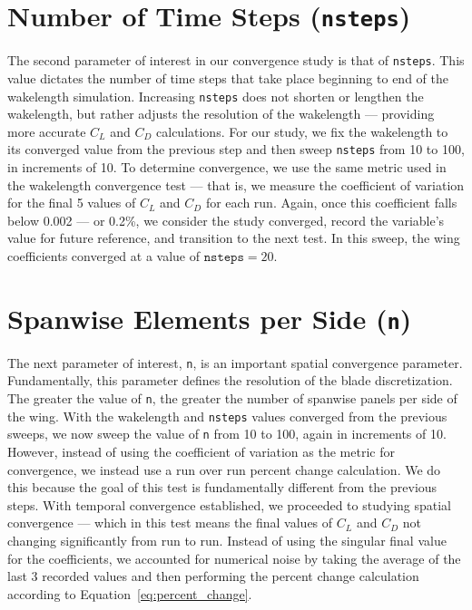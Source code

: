 \documentclass{report}
\begin{document}
\section{Number of Time Steps (\texttt{nsteps})}
The second parameter of interest in our convergence study is that of \texttt{nsteps}. This value dictates the number of time steps that take place beginning to end of the wakelength simulation.
Increasing \texttt{nsteps} does not shorten or lengthen the wakelength, but rather adjusts the resolution of the wakelength --- providing more accurate $C_L$ and $C_D$ calculations.
For our study, we fix the wakelength to its converged value from the previous step and then sweep \texttt{nsteps} from 10 to 100, in increments of 10.
To determine convergence, we use the same metric used in the wakelength convergence test --- that is, we measure the coefficient of variation for the final 5 values of $C_L$ and $C_D$ for each run.
Again, once this coefficient falls below 0.002 --- or 0.2\%, we consider the study converged, record the variable's value for future reference, and transition to the next test.
In this sweep, the wing coefficients converged at a value of $\texttt{nsteps} = 20$.


\section{Spanwise Elements per Side (\texttt{n})}
The next parameter of interest, \texttt{n}, is an important spatial convergence parameter. Fundamentally, this parameter defines the resolution of the blade discretization.
The greater the value of \texttt{n}, the greater the number of spanwise panels per side of the wing.
With the wakelength and \texttt{nsteps} values converged from the previous sweeps, we now sweep the value of \texttt{n} from 10 to 100, again in increments of 10.
However, instead of using the coefficient of variation as the metric for convergence, we instead use a run over run percent change calculation.
We do this because the goal of this test is fundamentally different from the previous steps. With temporal convergence established, we proceeded to studying spatial convergence --- which in this test means the final values of $C_L$ and $C_D$ not changing significantly from run to run.
Instead of using the singular final value for the coefficients, we accounted for numerical noise by taking the average of the last 3 recorded values and then performing the percent change calculation according to Equation~\ref{eq:percent_change}.
\end{document}
